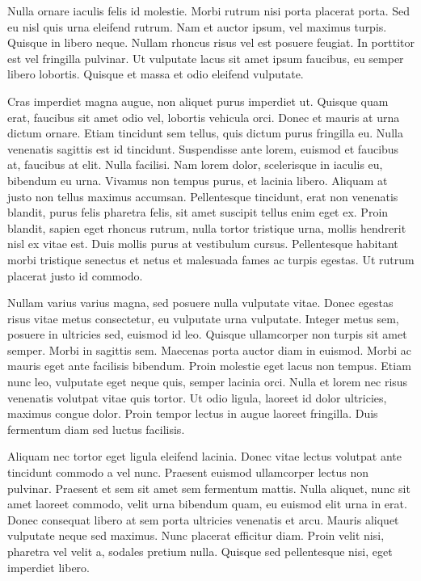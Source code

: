 Nulla ornare iaculis felis id molestie. Morbi rutrum nisi porta placerat porta. Sed eu nisl quis urna eleifend rutrum. Nam et auctor ipsum, vel maximus turpis. Quisque in libero neque. Nullam rhoncus risus vel est posuere feugiat. In porttitor est vel fringilla pulvinar. Ut vulputate lacus sit amet ipsum faucibus, eu semper libero lobortis. Quisque et massa et odio eleifend vulputate.

Cras imperdiet magna augue, non aliquet purus imperdiet ut. Quisque quam erat, faucibus sit amet odio vel, lobortis vehicula orci. Donec et mauris at urna dictum ornare. Etiam tincidunt sem tellus, quis dictum purus fringilla eu. Nulla venenatis sagittis est id tincidunt. Suspendisse ante lorem, euismod et faucibus at, faucibus at elit. Nulla facilisi. Nam lorem dolor, scelerisque in iaculis eu, bibendum eu urna. Vivamus non tempus purus, et lacinia libero. Aliquam at justo non tellus maximus accumsan. Pellentesque tincidunt, erat non venenatis blandit, purus felis pharetra felis, sit amet suscipit tellus enim eget ex. Proin blandit, sapien eget rhoncus rutrum, nulla tortor tristique urna, mollis hendrerit nisl ex vitae est. Duis mollis purus at vestibulum cursus. Pellentesque habitant morbi tristique senectus et netus et malesuada fames ac turpis egestas. Ut rutrum placerat justo id commodo.

Nullam varius varius magna, sed posuere nulla vulputate vitae. Donec egestas risus vitae metus consectetur, eu vulputate urna vulputate. Integer metus sem, posuere in ultricies sed, euismod id leo. Quisque ullamcorper non turpis sit amet semper. Morbi in sagittis sem. Maecenas porta auctor diam in euismod. Morbi ac mauris eget ante facilisis bibendum. Proin molestie eget lacus non tempus. Etiam nunc leo, vulputate eget neque quis, semper lacinia orci. Nulla et lorem nec risus venenatis volutpat vitae quis tortor. Ut odio ligula, laoreet id dolor ultricies, maximus congue dolor. Proin tempor lectus in augue laoreet fringilla. Duis fermentum diam sed luctus facilisis.

Aliquam nec tortor eget ligula eleifend lacinia. Donec vitae lectus volutpat ante tincidunt commodo a vel nunc. Praesent euismod ullamcorper lectus non pulvinar. Praesent et sem sit amet sem fermentum mattis. Nulla aliquet, nunc sit amet laoreet commodo, velit urna bibendum quam, eu euismod elit urna in erat. Donec consequat libero at sem porta ultricies venenatis et arcu. Mauris aliquet vulputate neque sed maximus. Nunc placerat efficitur diam. Proin velit nisi, pharetra vel velit a, sodales pretium nulla. Quisque sed pellentesque nisi, eget imperdiet libero.

